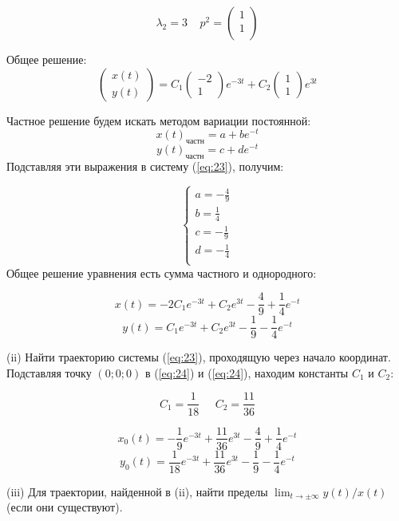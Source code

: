 \documentclass[a4paper, 12pt]{article}
\begin{document}
\[\lambda_2=3\;\;\;\; p^2=
\left(
\begin{array}{cc}
1\\
1\\
\end{array}
\right) 
\]

Общее решение:
\[\left(
\begin{array}{c}
x(t)\\
y(t)
\end{array}
\right)=C_1\left(
\begin{array}{c}
-2 \\
1
\end{array}
\right)e^{-3t}+C_2\left(
\begin{array}{c}
1 \\
1
\end{array}
\right)e^{3t}\]

Частное решение будем искать методом вариации постоянной:
\[x(t)_{\text{частн}}=a+be^{-t}\]
\[y(t)_{\text{частн}}=c+de^{-t}\]
Подставляя эти выражения в систему (\ref{eq:23}), получим:

\[
\left\{
\begin{array}{lr}
a = -\frac {4} {9}\\
b = \frac {1} {4}\\
c = -\frac {1} {9}\\
d = -\frac {1} {4}\\
\end{array}
\right.
\]
Общее решение уравнения есть сумма частного и однородного:

\begin{equation}
x(t) = -2C_1e^{-3t}+C_2e^{3t}-\frac 4 9 + \frac 1 4 e^{-t}
\label{eq:24}
\end{equation}
\begin{equation}
y(t) =C_1e^{-3t}+C_2e^{3t}- \frac 1 9 -\frac 1 4 e^{-t}
\label{eq:25}
\end{equation}

(ii) Найти траекторию системы (\ref{eq:23}), проходящую через начало координат.\\
Подставляя точку $(0;0;0)$ в (\ref{eq:24}) и (\ref{eq:24}), находим константы $C_1$ и $C_2$:

\[C_1 = \frac 1 {18}\;\;\;\;\; C_2 = \frac{11} {36}\]

\[
x_0(t) =-\frac 1 9 e^{-3t}+\frac{11}{36}e^{3t}-\frac 4 9 + \frac 1 4 e^{-t}\]
\[
y_0(t) =\frac 1 {18}e^{-3t}+\frac{11} {36} e^{3t}- \frac 1 9 -\frac 1 4 e^{-t}
\]

(iii) Для траектории, найденной в (ii), найти пределы $\lim_{t\rightarrow\pm\infty}y(t)/x(t)$ (если они существуют).
\end{document}
